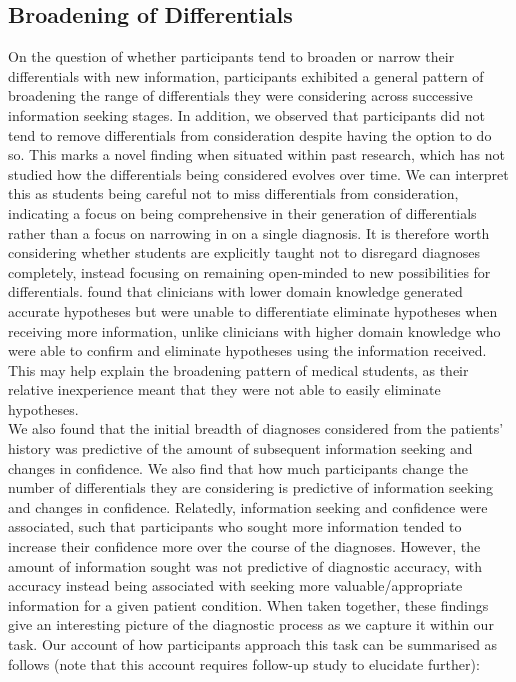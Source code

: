 \documentclass[a4paper, nobind]{templates/ociamthesis}
\begin{document}
\subsection{Broadening of Differentials}\label{broadening-of-differentials}

On the question of whether participants tend to broaden or narrow their differentials with new information, participants exhibited a general pattern of broadening the range of differentials they were considering across successive information seeking stages. In addition, we observed that participants did not tend to remove differentials from consideration despite having the option to do so. This marks a novel finding when situated within past research, which has not studied how the differentials being considered evolves over time. We can interpret this as students being careful not to miss differentials from consideration, indicating a focus on being comprehensive in their generation of differentials rather than a focus on narrowing in on a single diagnosis. It is therefore worth considering whether students are explicitly taught not to disregard diagnoses completely, instead focusing on remaining open-minded to new possibilities for differentials. \autocite{joseph_domain_1990} found that clinicians with lower domain knowledge generated accurate hypotheses but were unable to differentiate eliminate hypotheses when receiving more information, unlike clinicians with higher domain knowledge who were able to confirm and eliminate hypotheses using the information received. This may help explain the broadening pattern of medical students, as their relative inexperience meant that they were not able to easily eliminate hypotheses.\\

We also found that the initial breadth of diagnoses considered from the patients' history was predictive of the amount of subsequent information seeking and changes in confidence. We also find that how much participants change the number of differentials they are considering is predictive of information seeking and changes in confidence. Relatedly, information seeking and confidence were associated, such that participants who sought more information tended to increase their confidence more over the course of the diagnoses. However, the amount of information sought was not predictive of diagnostic accuracy, with accuracy instead being associated with seeking more valuable/appropriate information for a given patient condition. When taken together, these findings give an interesting picture of the diagnostic process as we capture it within our task. Our account of how participants approach this task can be summarised as follows (note that this account requires follow-up study to elucidate further):
\end{document}
